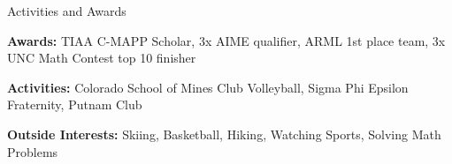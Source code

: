 \documentclass{resume} %
\begin{document}
\vspace{-6pt}



\begin{rSection}{Activities and Awards} 

\textbf{Awards:} TIAA C-MAPP Scholar, 3x AIME qualifier, ARML 1st place team, 3x UNC Math Contest top 10 finisher
\vspace{-4pt}

\textbf{Activities:} Colorado School of Mines Club Volleyball, Sigma Phi Epsilon Fraternity, Putnam Club
\vspace{-4pt}

\textbf{Outside Interests:} Skiing, Basketball, Hiking, Watching Sports, Solving Math Problems


 

\end{rSection}
\end{document}
